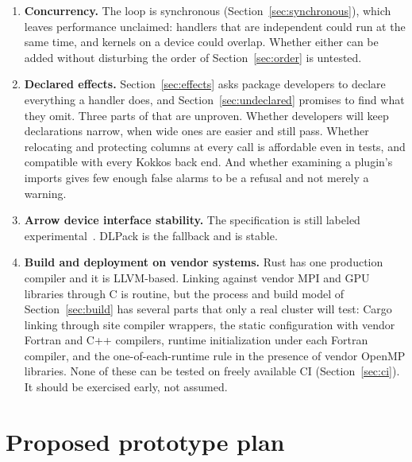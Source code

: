 \documentclass[11pt,a4paper]{article}
\begin{document}
\begin{enumerate}
        operations on a device can be provided without the core acquiring a
        GPU kernel technology of its own.  A mesh is therefore the test
        problem at every milestone.
  \item \textbf{Concurrency.}  The loop is synchronous
        (Section~\ref{sec:synchronous}), which leaves performance unclaimed:
        handlers that are independent could run at the same time, and
        kernels on a device could overlap.  Whether either can be added
        without disturbing the order of Section~\ref{sec:order} is untested.
  \item \textbf{Declared effects.}  Section~\ref{sec:effects} asks package
        developers to declare everything a handler does, and
        Section~\ref{sec:undeclared} promises to find what they omit.  Three
        parts of that are unproven.  Whether developers will keep
        declarations narrow, when wide ones are easier and still pass.
        Whether relocating and protecting columns at every call is
        affordable even in tests, and compatible with every Kokkos back
        end.  And whether examining a plugin's imports gives few enough
        false alarms to be a refusal and not merely a warning.
  \item \textbf{Arrow device interface stability.}  The specification is
        still labeled experimental~\cite{arrowcdevice}.  DLPack is the
        fallback and is stable.
  \item \label{risk:build} \textbf{Build and deployment on vendor systems.}
        Rust has one production compiler and it is LLVM-based.  Linking
        against vendor MPI and GPU libraries through C is routine, but the
        process and build model of Section~\ref{sec:build} has several parts
        that only a real cluster will test: Cargo linking through site
        compiler wrappers, the static configuration with vendor Fortran and
        C++ compilers, runtime initialization under each Fortran compiler,
        and the one-of-each-runtime rule in the presence of vendor OpenMP
        libraries.  None of these can be tested on freely available CI
        (Section~\ref{sec:ci}).  It should be exercised early, not assumed.
\end{enumerate}

\section{Proposed prototype plan}
\label{sec:roadmap}
\end{document}

